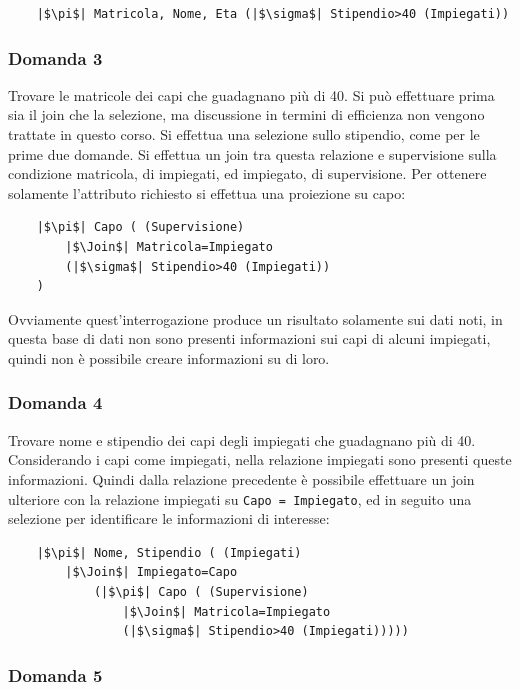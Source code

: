 \documentclass{article}
\begin{document}
\begin{verbatim}
    |$\pi$| Matricola, Nome, Eta (|$\sigma$| Stipendio>40 (Impiegati))
\end{verbatim}

\subsubsection*{Domanda 3}

Trovare le matricole dei capi che guadagnano più di 40. Si può effettuare prima sia il join che la selezione, ma discussione in termini di efficienza non vengono trattate in questo corso. Si effettua una selezione 
sullo stipendio, come per le prime due domande. Si effettua un join tra questa relazione e supervisione sulla condizione matricola, di impiegati, ed impiegato, di supervisione. Per ottenere solamente l'attributo 
richiesto si effettua una proiezione su capo:
\begin{verbatim}
    |$\pi$| Capo ( (Supervisione)
        |$\Join$| Matricola=Impiegato
        (|$\sigma$| Stipendio>40 (Impiegati))
    )
\end{verbatim}

Ovviamente quest'interrogazione produce un risultato solamente sui dati noti, in questa base di dati non sono presenti informazioni sui capi di alcuni impiegati, quindi non è possibile creare informazioni su di loro. 

\subsubsection*{Domanda 4}
Trovare nome e stipendio dei capi degli impiegati che guadagnano più di 40. Considerando i capi come impiegati, nella relazione impiegati sono presenti queste informazioni. Quindi dalla relazione precedente è possibile 
effettuare un join ulteriore con la relazione impiegati su \verb|Capo = Impiegato|, ed in seguito una selezione per identificare le informazioni di interesse:
\begin{verbatim}
    |$\pi$| Nome, Stipendio ( (Impiegati)
        |$\Join$| Impiegato=Capo 
            (|$\pi$| Capo ( (Supervisione)
                |$\Join$| Matricola=Impiegato
                (|$\sigma$| Stipendio>40 (Impiegati)))))
\end{verbatim}

\subsubsection*{Domanda 5}
\end{document}
